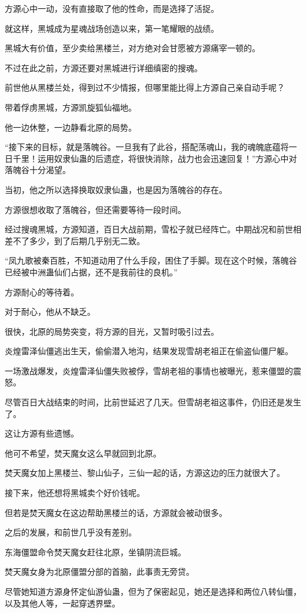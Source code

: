 \begin{this_body}
方源心中一动，没有直接取了他的性命，而是选择了活捉。

就这样，黑城成为星魂战场创造以来，第一笔耀眼的战绩。

黑城大有价值，至少卖给黑楼兰，对方绝对会甘愿被方源痛宰一顿的。

不过在此之前，方源还要对黑城进行详细缜密的搜魂。

前世他从黑楼兰处，得到过不少情报，但哪里能比得上方源自己亲自动手呢？

带着俘虏黑城，方源凯旋狐仙福地。

他一边休整，一边静看北原的局势。

“接下来的目标，就是落魄谷。一旦我有了此谷，搭配荡魂山，我的魂魄底蕴将一日千里！运用奴隶仙蛊的后遗症，将很快消除，战力也会迅速回复！”方源心中对落魄谷十分渴望。

当初，他之所以选择换取奴隶仙蛊，也是因为落魄谷的存在。

方源很想收取了落魄谷，但还需要等待一段时间。

经过搜魂黑城，方源知道，百日大战前期，雪松子就已经阵亡。中期战况和前世相差不了多少，到了后期几乎别无二致。

“凤九歌被秦百胜，不知道动用了什么手段，困住了手脚。现在这个时候，落魄谷已经被中洲蛊仙们占据，还不是我前往的良机。”

方源耐心的等待着。

对于耐心，他从不缺乏。

很快，北原的局势突变，将方源的目光，又暂时吸引过去。

炎煌雷泽仙僵逃出生天，偷偷潜入地沟，结果发现雪胡老祖正在偷盗仙僵尸躯。

一场激战爆发，炎煌雷泽仙僵失败被俘，雪胡老祖的事情也被曝光，惹来僵盟的震怒。

尽管百日大战结束的时间，比前世延迟了几天。但雪胡老祖这事件，仍旧还是发生了。

这让方源有些遗憾。

他可不希望，焚天魔女这么早就回到北原。

焚天魔女加上黑楼兰、黎山仙子，三仙一起的话，方源这边的压力就很大了。

接下来，他还想将黑城卖个好价钱呢。

但若是焚天魔女在这边帮助黑楼兰的话，方源就会被动很多。

之后的发展，和前世几乎没有差别。

东海僵盟命令焚天魔女赶往北原，坐镇阴流巨城。

焚天魔女身为北原僵盟分部的首脑，此事责无旁贷。

尽管她知道方源身怀定仙游仙蛊，但为了保密起见，她还是选择和两位八转仙僵，以及其他人等，一起穿透界壁。


\end{this_body}
